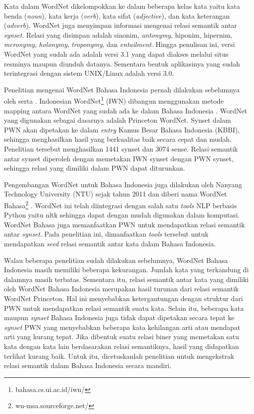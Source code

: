 Kata dalam WordNet dikelompokkan ke dalam beberapa kelas kata yaitu kata benda (\textit{noun}), kata kerja (\textit{verb}), kata sifat (\textit{adjective}), dan kata keterangan (\textit{adverb}). WordNet juga menyimpan informasi mengenai relasi semantik antar \textit{synset}. Relasi yang disimpan adalah sinonim, \textit{antonymy}, hiponim, hipernim, \textit{meronymy}, \textit{holonymy}, \textit{troponymy}, dan \textit{entailment}. Hingga penulisan ini, versi WordNet yang sudah ada adalah versi 3.1 yang dapat diakses melalui situs resminya maupun diunduh datanya. Sementara bentuk aplikasinya yang sudah terintegrasi dengan sistem UNIX/Linux adalah versi 3.0. 

Penelitian mengenai WordNet Bahasa Indonesia pernah dilakukan sebelumnya oleh \cite{putra2008building} serta \cite{margaretha2008comparing}. Indonesian WordNet\footnote{bahasa.cs.ui.ac.id/iwn/} (IWN) dibangun menggunakan metode mapping antara WordNet yang sudah ada ke dalam Bahasa Indonesia \citep{putra2008building}. WordNet yang digunakan sebagai dasarnya adalah Princeton WordNet. Synset dalam PWN akan dipetakan ke dalam \textit{entry} Kamus Besar Bahasa Indonesia (KBBI), sehingga menghasilkan hasil yang berkualitas baik secara cepat dan mudah. Penelitian tersebut menghasilkan 1441 synset dan 3074 sense. Relasi semantik antar synset diperoleh dengan memetakan IWN synset dengan PWN synset, sehingga relasi yang dimiliki dalam PWN dapat diturunkan.

Pengembangan WordNet untuk Bahasa Indonesia juga dilakukan oleh Nanyang Technology University (NTU) sejak tahun 2011 dan diberi nama WordNet Bahasa\footnote{wn-msa.sourceforge.net/} \citep{noor2011creating}. WordNet ini telah diintegrasi dengan salah satu \textit{tools} NLP berbasis Python yaitu nltk sehingga dapat dengan mudah digunakan dalam komputasi. WordNet Bahasa juga memanfaatkan PWN untuk mendapatkan relasi semantik antar \textit{synset}. Pada penelitian ini, dimanfaatkan \textit{tools} tersebut untuk mendapatkan \textit{seed} relasi semantik antar kata dalam Bahasa Indonesia.

Walau beberapa penelitian sudah dilakukan sebelumnya, WordNet Bahasa Indonesia masih memiliki beberapa kekurangan. Jumlah kata yang terkandung di dalamnya masih terbatas. Sementara itu, relasi semantik antar kata yang dimiliki oleh WordNet Bahasa Indonesia merupakan hasil turunan dari relasi semantik WordNet Princeton. Hal ini menyebabkan ketergantungan dengan struktur dari PWN untuk mendapatkan relasi semantik suatu kata. Selain itu, beberapa kata maupun \textit{synset} Bahasa Indonesia juga tidak dapat dipetakan secara tepat ke \textit{synset} PWN yang menyebabkan beberapa kata kehilangan arti atau mendapat arti yang kurang tepat. Jika dibentuk suatu relasi biner yang memetakan satu kata dengan kata lain berdasarakan relasi semantiknya, hasil yang didapatkan terlihat kurang baik. Untuk itu, dicetuskanlah penelitian untuk mengekstrak relasi semantik dalam Bahasa Indonesia secara mandiri. 

